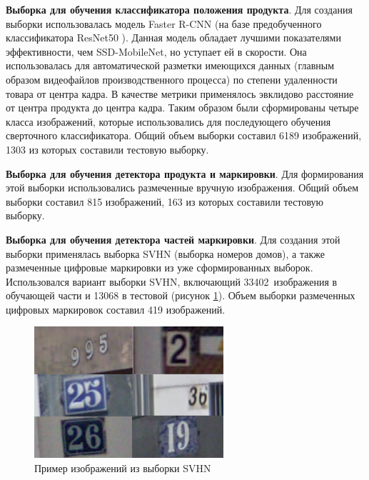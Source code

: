 \textbf{Выборка для обучения классификатора положения продукта}. Для создания выборки использовалась модель Faster R-CNN \cite{ren} (на базе  предобученного классификатора ResNet50 \cite{he}). Данная модель обладает лучшими показателями эффективности, чем SSD-MobileNet, но уступает ей в скорости. Она использовалась для автоматической разметки имеющихся данных (главным образом видеофайлов производственного процесса) по степени удаленности товара от центра кадра. В качестве метрики применялось эвклидово расстояние от центра продукта до центра кадра. Таким образом были сформированы четыре класса изображений, которые использовались для последующего обучения сверточного классификатора. Общий объем выборки составил 6189 изображений, 1303 из которых составили тестовую выборку.

\textbf{Выборка для обучения детектора продукта и маркировки}. Для формирования этой выборки использовались размеченные вручную изображения. Общий объем выборки составил 815 изображений, 163 из которых составили тестовую выборку.


\textbf{Выборка для обучения детектора частей маркировки}. Для создания этой выборки применялась выборка SVHN \cite{netzer} (выборка номеров домов), а также размеченные цифровые маркировки из уже сформированных выборок. Использовался вариант выборки SVHN, включающий 33402~изображения в обучающей части и 13068 в тестовой (рисунок \ref{fig:svhn_dataset}). Объем выборки размеченных цифровых маркировок составил 419 изображений.

\begin{figure}[ht]
	\centering
	\includegraphics[width=7cm]{man-source/images/ch4/pic4-14.png}
	\caption{Пример изображений из выборки SVHN}
	\label{fig:svhn_dataset}
\end{figure}

